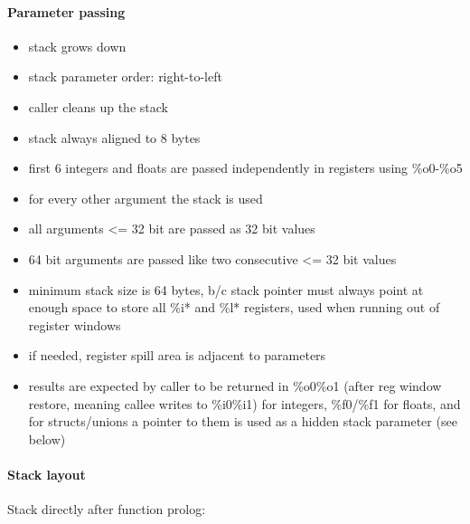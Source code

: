\paragraph{Parameter passing}
\begin{itemize}
\item stack grows down
\item stack parameter order: right-to-left
\item caller cleans up the stack
\item stack always aligned to 8 bytes
\item first 6 integers and floats are passed independently in registers using \%o0-\%o5
\item for every other argument the stack is used
\item all arguments <= 32 bit are passed as 32 bit values
\item 64 bit arguments are passed like two consecutive <= 32 bit values
\item minimum stack size is 64 bytes, b/c stack pointer must always point at enough space to store all \%i* and \%l* registers, used when running out of register windows
\item if needed, register spill area is adjacent to parameters
\item results are expected by caller to be returned in \%o0\%o1 (after reg window restore, meaning callee writes to \%i0\%i1) for integers, \%f0/\%f1 for floats, and for structs/unions a pointer to them is used as a hidden stack parameter (see below)
\end{itemize}

\paragraph{Stack layout}

Stack directly after function prolog:\\

